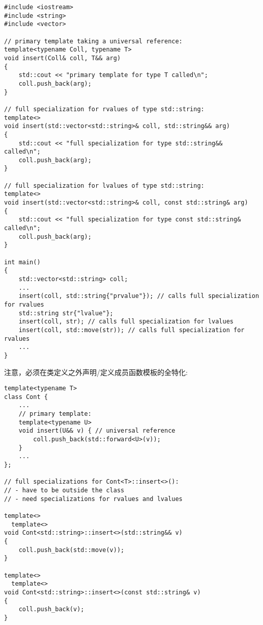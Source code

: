 \begin{lstlisting}[caption={}]
#include <iostream>
#include <string>
#include <vector>

// primary template taking a universal reference:
template<typename Coll, typename T>
void insert(Coll& coll, T&& arg)
{
	std::cout << "primary template for type T called\n";
	coll.push_back(arg);
}

// full specialization for rvalues of type std::string:
template<>
void insert(std::vector<std::string>& coll, std::string&& arg)
{
	std::cout << "full specialization for type std::string&& called\n";
	coll.push_back(arg);
}

// full specialization for lvalues of type std::string:
template<>
void insert(std::vector<std::string>& coll, const std::string& arg)
{
	std::cout << "full specialization for type const std::string& called\n";
	coll.push_back(arg);
}

int main()
{
	std::vector<std::string> coll;
	...
	insert(coll, std::string{"prvalue"}); // calls full specialization for rvalues
	std::string str{"lvalue"};
	insert(coll, str); // calls full specialization for lvalues
	insert(coll, std::move(str)); // calls full specialization for rvalues
	...
}
\end{lstlisting}

注意，必须在类定义之外声明/定义成员函数模板的全特化:\par

\begin{lstlisting}[caption={}]
template<typename T>
class Cont {
	...
	// primary template:
	template<typename U>
	void insert(U&& v) { // universal reference
		coll.push_back(std::forward<U>(v));
	}
	...
};

// full specializations for Cont<T>::insert<>():
// - have to be outside the class
// - need specializations for rvalues and lvalues

template<>
  template<>
void Cont<std::string>::insert<>(std::string&& v)
{
	coll.push_back(std::move(v));
}

template<>
  template<>
void Cont<std::string>::insert<>(const std::string& v)
{
	coll.push_back(v);
}
\end{lstlisting}


















































